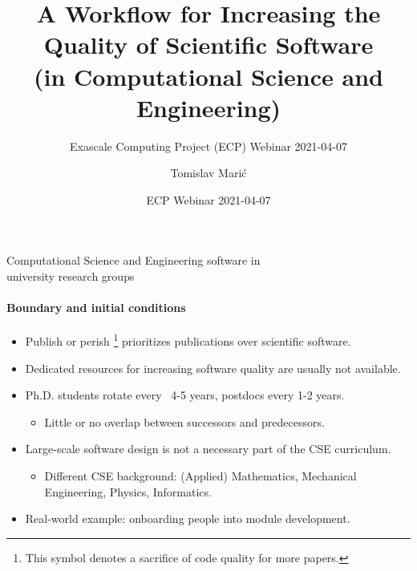\documentclass[
	ngerman,%
	aspectratio=169,%
	color={accentcolor=2d},
	logo=true,%
	colorframetitle=true,%
	]{tudabeamer}
\title{A Workflow for Increasing the Quality of Scientific Software\\ (in Computational Science and Engineering)}
\subtitle{Exascale Computing Project (ECP) Webinar 2021-04-07}
\author[\textbf{T. Mari\'c}, JP. Lehr, I. Pappagianidis, B. Lambie, D. Bothe, C. Bischof]{Tomislav Mari\'c}
\institute{CRC 1194 : Z-INF}
\date{ECP Webinar 2021-04-07}
\begin{document}
\maketitle

\begin{frame}{Computational Science and Engineering software in\\university research groups}
	\framesubtitle{Boundary and initial conditions}
	
	\vfill
	\begin{itemize}
            \item Publish or perish \faGraduationCap\footnote{This symbol denotes a sacrifice of code quality for more papers.} prioritizes publications over scientific software.
		\item Dedicated resources for increasing software quality are usually not available.
		\item Ph.D. students rotate every ~4-5 years, postdocs every 1-2 years. 
			\begin{itemize}
				\item Little or no overlap between successors and predecessors. 
			\end{itemize}
		\item Large-scale software design is not a necessary part of the CSE curriculum. 
			\begin{itemize}
				\item Different CSE background: (Applied) Mathematics, Mechanical Engineering, Physics, Informatics.
			\end{itemize}
		\item Real-world example: onboarding people into \href{https://www.openfoam.com/documentation/guides/latest/api/classes.html}{} module development.
	\end{itemize}
\end{frame}
\end{document}
